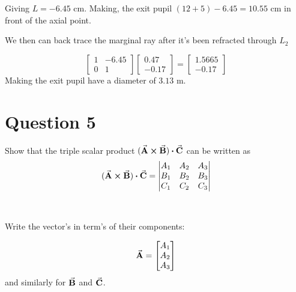 \documentclass[a4paper]{article}
\begin{document}
Giving $L=-6.45$ cm. Making, the exit pupil $(12 + 5) - 6.45 = 10.55$ cm in front of the axial point.

We then can back trace the marginal ray after it's been refracted through $L_2$

$$
\begin{bmatrix}
    1 & -6.45\\
    0 & 1
\end{bmatrix}
\begin{bmatrix}
    0.47\\
    -0.17 
\end{bmatrix}
=
\begin{bmatrix}
    1.5665\\
    -0.17
\end{bmatrix}
$$
Making the exit pupil have a diameter of $3.13$ m.



\section*{Question 5}
Show that the triple scalar product $(\va{A} \cross \va{B}) \vdot \va{C}$ can be written as
$$ (\va{A} \cross \va{B}) \vdot \va{C} = 
    \begin{vmatrix}
    A_1 & A_2 & A_3 \\
    B_1 & B_2 & B_3 \\
    C_1 & C_2 & C_3 
    \end{vmatrix}  $$ \\\\

Write the vector's in term's of their components:

$$ \va{A} = \begin{bmatrix}
    A_1 \\
    A_2 \\
    A_3 \\
\end{bmatrix} $$
and similarly for $\va{B}$ and $\va{C}$.
\end{document}
